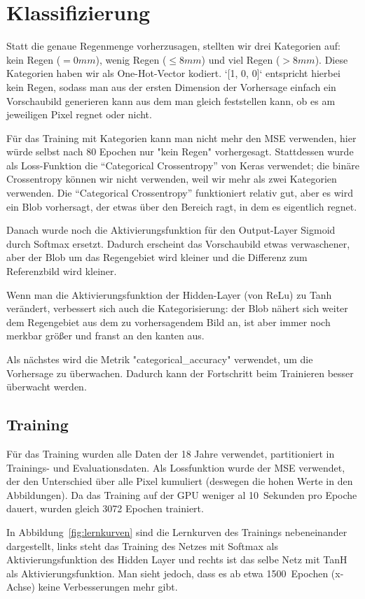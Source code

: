 \section{Klassifizierung}
Statt die genaue Regenmenge vorherzusagen, stellten wir drei Kategorien auf: kein Regen ($= 0mm$), wenig Regen ($\leq 8mm$) und viel Regen ($> 8mm$). Diese Kategorien haben wir als One-Hot-Vector kodiert. `[1, 0, 0]` entspricht hierbei kein Regen, sodass man aus der ersten Dimension der Vorhersage einfach ein Vorschaubild generieren kann aus dem man gleich feststellen kann, ob es am jeweiligen Pixel regnet oder nicht.

Für das Training mit Kategorien kann man nicht mehr den MSE verwenden, hier würde selbst nach 80 Epochen nur "kein Regen" vorhergesagt. Stattdessen wurde als Loss-Funktion die \enquote{Categorical Crossentropy} von Keras verwendet; die binäre Crossentropy können wir nicht verwenden, weil wir mehr als zwei Kategorien verwenden. Die \enquote{Categorical Crossentropy} funktioniert relativ gut, aber es wird ein Blob vorhersagt, der etwas über den Bereich ragt, in dem es eigentlich regnet.

Danach wurde noch die Aktivierungsfunktion für den Output-Layer Sigmoid durch Softmax ersetzt. Dadurch erscheint das Vorschaubild etwas verwaschener, aber der Blob um das Regengebiet wird kleiner und die Differenz zum Referenzbild wird kleiner.

Wenn man die Aktivierungsfunktion der Hidden-Layer (von ReLu) zu Tanh verändert, verbessert sich auch die Kategorisierung: der Blob nähert sich weiter dem Regengebiet aus dem zu vorhersagendem Bild an, ist aber immer noch merkbar größer und franst an den kanten aus.

Als nächstes wird die Metrik "categorical\_accuracy" verwendet, um die Vorhersage zu überwachen. Dadurch kann der Fortschritt beim Trainieren besser überwacht werden.


\subsection{Training}
Für das Training wurden alle Daten der 18 Jahre verwendet, partitioniert in Trainings- und Evaluationsdaten. Als Lossfunktion wurde der MSE verwendet, der den Unterschied über alle Pixel kumuliert (deswegen die hohen Werte in den Abbildungen). Da das Training auf der GPU weniger al 10~Sekunden pro Epoche dauert, wurden gleich 3072 Epochen trainiert.

In Abbildung~\ref{fig:lernkurven} sind die Lernkurven des Trainings nebeneinander dargestellt, links steht das Training des Netzes mit Softmax als Aktivierungsfunktion des Hidden Layer und rechts ist das selbe Netz mit TanH als Aktivierungsfunktion. Man sieht jedoch, dass es ab etwa 1500~Epochen (x-Achse) keine Verbesserungen mehr gibt.

